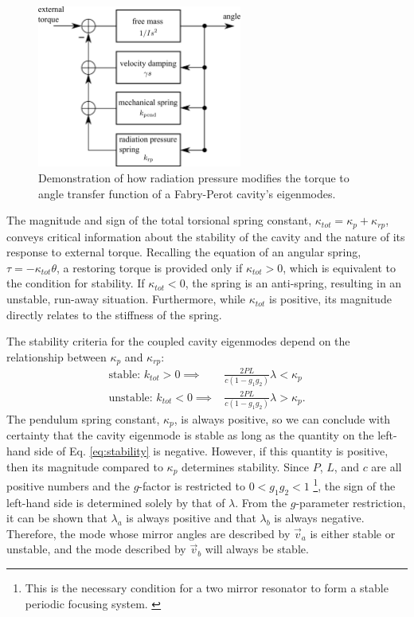 \begin{figure}
\begin{centering}
\includegraphics[width=0.6\textwidth]{figures/pendulumLoop.pdf}
\caption[Controls view of addition of radiation pressure to the pendulum
transfer function]{Demonstration of how radiation pressure modifies the torque to
  angle transfer function of a Fabry-Perot cavity's eigenmodes.}
\label{fig:pendloop}
\end{centering}
\end{figure}

The magnitude and sign of the total torsional spring constant,
$\kappa_{tot} = \kappa_p + \kappa_{rp}$, conveys critical information
about the stability of the cavity and the nature of its response to
external torque. Recalling the equation of an angular spring, $\tau =
- \kappa_{tot} \theta$, a restoring torque is provided only if
$\kappa_{tot} > 0$, which is equivalent to the condition for
stability. If $\kappa_{tot} < 0$, the spring is an anti-spring,
resulting in an unstable, run-away situation. Furthermore, 
while $\kappa_{tot}$ is positive, its magnitude directly relates to
the stiffness of the spring.

The stability criteria for the coupled cavity eigenmodes 
depend on the relationship between $\kappa_p$ and $\kappa_{rp}$:
\begin{align}
\mbox{stable: } k_{tot} > 0 \implies & \frac{2 P L}{c (1-g_1 g_2)} \lambda < \kappa_p \\
\mbox{unstable: } k_{tot} < 0 \implies & \frac{2 P L}{c (1-g_1 g_2)} \lambda > \kappa_p.
\label{eq:stability}
\end{align}
The pendulum spring constant, $\kappa_p$, is always positive, so we
can conclude with certainty that the cavity eigenmode is stable as
long as the quantity on the left-hand side of Eq. \ref{eq:stability}
is negative. However, if this quantity is positive, then its magnitude
compared to $\kappa_p$ determines stability. Since $P$, $L$, and $c$
are all positive numbers and the $g$-factor is restricted to $0 < g_1g_2
< 1$ \footnote{This is the necessary condition for a two mirror
  resonator to form a stable periodic focusing
  system. \cite[p. 747]{Siegman1986Lasers}}, the sign of the left-hand
side is determined solely by that of $\lambda$. From the $g$-parameter
restriction, it can be shown that $\lambda_a$ is always positive and
that $\lambda_b$ is always negative. Therefore, the mode whose mirror
angles are described by $\vec{v}_a$ is either stable or unstable, and
the mode described by $\vec{v}_b$ will always be stable.

